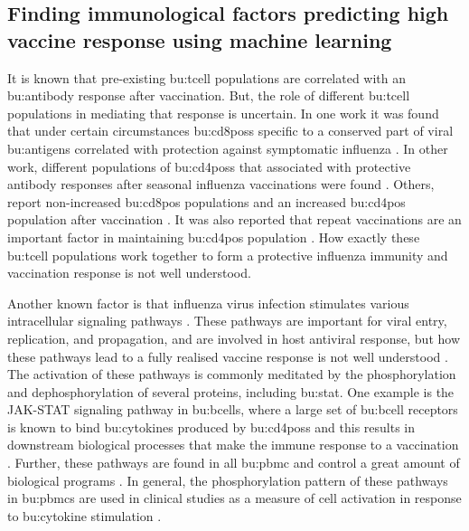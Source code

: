\subsection{Finding immunological factors predicting high vaccine response using machine learning}

It is known that pre-existing \gls{bu:tcell} populations are correlated with an \gls{bu:antibody} response after vaccination.
But, the role of different \gls{bu:tcell} populations in mediating that response is uncertain.
In one work it was found that under certain circumstances \gls{bu:cd8pos}s specific to a conserved part of viral \gls{bu:antigen}s correlated with protection against symptomatic influenza \citep{sridharCellularImmuneCorrelates2013}.
In other work, different populations of \gls{bu:cd4pos}s that associated with protective antibody responses after seasonal influenza vaccinations were found \citep{bentebibelInductionICOSCXCR3}.
Others, report non-increased \gls{bu:cd8pos} populations and an increased \gls{bu:cd4pos} population after vaccination \citep{trieuLongtermMaintenanceInfluenzaSpecific2017}.
It was also reported that repeat vaccinations are an important factor in maintaining \gls{bu:cd4pos} population \citep{trieuLongtermMaintenanceInfluenzaSpecific2017}.
How exactly these \gls{bu:tcell} populations work together to form a protective influenza immunity and vaccination response is not well understood.

Another known factor is that influenza virus infection stimulates various intracellular signaling pathways \citep{Zhang_2019}.
These pathways are important for viral entry, replication, and propagation, and are involved in host antiviral response, but how these pathways lead to a fully realised vaccine response is not well understood \citep{Zhang_2018}.
The activation of these pathways is commonly meditated by the phosphorylation and dephosphorylation of several proteins, including \gls{bu:stat}.
One example is the JAK-STAT signaling pathway in \gls{bu:bcell}s, where a large set of \gls{bu:bcell} receptors is known to bind \gls{bu:cytokine}s produced by \gls{bu:cd4pos}s and this results in downstream biological processes that make the immune response to a vaccination \citep{Papin_2004}.
Further, these pathways are found in all \gls{bu:pbmc} and control a great amount of biological programs  \citep{Cantrell_2015}.
In general, the phosphorylation pattern of these pathways in \gls{bu:pbmc}s are used in clinical studies as a measure of cell activation in response to \gls{bu:cytokine} stimulation  \citep{Toapanta_2012,tomicFluPRINTDatasetMultidimensional2019}.

